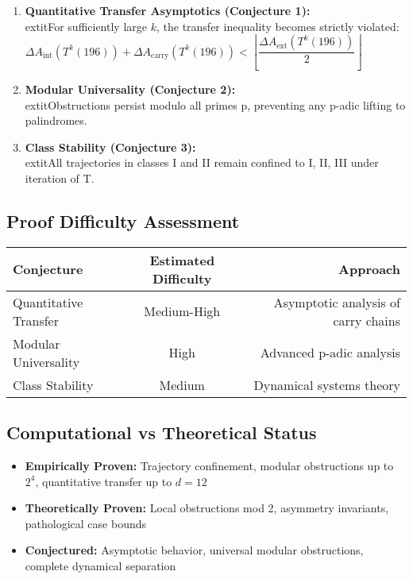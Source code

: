 \documentclass[12pt,a4paper]{article}
\begin{document}
\begin{enumerate}
\item \textbf{Quantitative Transfer Asymptotics (Conjecture 1):} \\
		extit{For sufficiently large $k$, the transfer inequality becomes strictly violated:}\\
	$\Delta A_{\mathrm{int}}(T^k(196)) + \Delta A_{\mathrm{carry}}(T^k(196)) < \left\lfloor \dfrac{\Delta A_{\mathrm{ext}}(T^k(196))}{2} \right\rfloor$

\item \textbf{Modular Universality (Conjecture 2):} \\
   extit{Obstructions persist modulo all primes p, preventing any p-adic lifting to palindromes.}

\item \textbf{Class Stability (Conjecture 3):} \\
   extit{All trajectories in classes I and II remain confined to {I, II, III} under iteration of T.}
\end{enumerate}

\subsection{Proof Difficulty Assessment}

\begin{tabular}{@{}l c r@{}}
\toprule
\textbf{Conjecture} & \textbf{Estimated Difficulty} & \textbf{Approach} \\
\midrule
Quantitative Transfer & Medium-High & Asymptotic analysis of carry chains \\
Modular Universality & High & Advanced p-adic analysis \\
Class Stability & Medium & Dynamical systems theory \\
\bottomrule
\end{tabular}

\subsection{Computational vs Theoretical Status}

\begin{itemize}
\item \textbf{Empirically Proven:} Trajectory confinement, modular obstructions up to $2^{4}$, quantitative transfer up to $d=12$
\item \textbf{Theoretically Proven:} Local obstructions mod 2, asymmetry invariants, pathological case bounds
\item \textbf{Conjectured:} Asymptotic behavior, universal modular obstructions, complete dynamical separation
\end{itemize}
\end{document}
